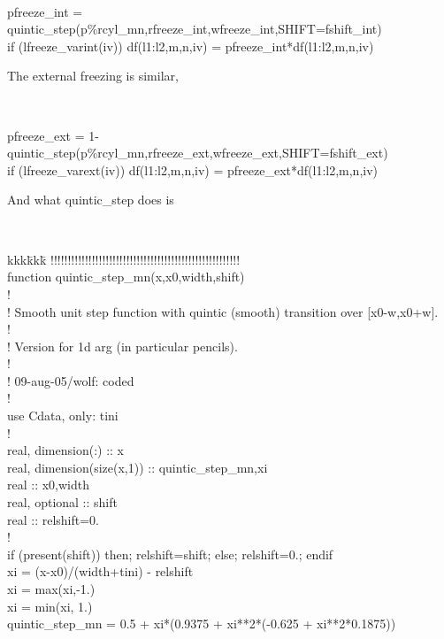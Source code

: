 \documentclass[a4paper,10pt]{article}
\begin{document}
{\tt 
\begin{tabbing}
pfreeze\_int = quintic\_step(p\%rcyl\_mn,rfreeze\_int,wfreeze\_int,SHIFT=fshift\_int)\\
if (lfreeze\_varint(iv)) df(l1:l2,m,n,iv) = pfreeze\_int*df(l1:l2,m,n,iv)
\end{tabbing}
}The external freezing is similar, 
{\tt
\begin{tabbing}
pfreeze\_ext = 1-quintic\_step(p\%rcyl\_mn,rfreeze\_ext,wfreeze\_ext,SHIFT=fshift\_ext)\\
if (lfreeze\_varext(iv)) df(l1:l2,m,n,iv) = pfreeze\_ext*df(l1:l2,m,n,iv)
\end{tabbing}
}

And what quintic\_step does is 

{\tt 
\begin{tabbing}
  kkk\=kkk\=\kill  
!!!!!!!!!!!!!!!!!!!!!!!!!!!!!!!!!!!!!!!!!!!!!!!!!!!!!!!\\
\>      function quintic\_step\_mn(x,x0,width,shift)\\
!\\
!  Smooth unit step function with quintic (smooth) transition over [x0-w,x0+w].\\
!\\
!  Version for 1d arg (in particular pencils).\\
!\\
!  09-aug-05/wolf: coded\\
!\\
        use Cdata, only: tini\\
!\\
  \>\>      real, dimension(:) :: x\\
  \>\>      real, dimension(size(x,1)) :: quintic\_step\_mn,xi\\
  \>\>      real :: x0,width\\
  \>\>      real, optional :: shift\\
  \>\>      real :: relshift=0.\\
!\\
  \>\>      if (present(shift)) then; relshift=shift; else; relshift=0.; endif\\
  \>\>      xi = (x-x0)/(width+tini) - relshift\\
  \>\>      xi = max(xi,-1.)\\
  \>\>      xi = min(xi, 1.)\\
  \>\>      quintic\_step\_mn = 0.5 + xi*(0.9375 + xi**2*(-0.625 + xi**2*0.1875))
\end{tabbing}
}
\end{document}
